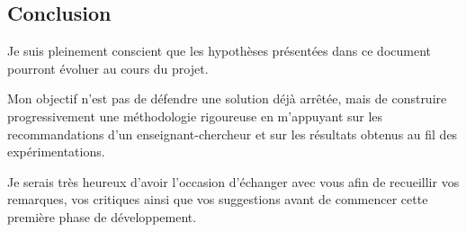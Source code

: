 \subsection{Conclusion}

Je suis pleinement conscient que les hypothèses présentées dans ce
document pourront évoluer au cours du projet.

Mon objectif n'est pas de défendre une solution déjà arrêtée, mais de
construire progressivement une méthodologie rigoureuse en m'appuyant sur
les recommandations d'un enseignant-chercheur et sur les résultats
obtenus au fil des expérimentations.

Je serais très heureux d'avoir l'occasion d'échanger avec vous afin de
recueillir vos remarques, vos critiques ainsi que vos suggestions avant
de commencer cette première phase de développement.